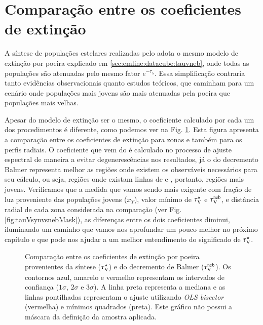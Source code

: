 \section{Comparação entre os coeficientes de extinção}
\label{sec:synvsneb:tauv}

A síntese de populações estelares realizadas pelo \starlight adota o mesmo modelo de extinção por
poeira explicado em \ref{sec:emline:datacube:tauvneb}, onde todas as populações são atenuadas pelo
mesmo fator $e^{-\tau_\lambda}$. Essa simplificação contraria tanto evidências observacionais quanto
estudos teóricos, que caminham para um cenário onde populações mais jovens são mais atenuadas pela
poeira que populações mais velhas. 

Apesar do modelo de extinção ser o mesmo, o coeficiente calculado por cada um dos procedimentos é
diferente, como podemos ver na Fig. \ref{fig:tauVsynvsneb}. Esta figura apresenta a comparação entre
os coeficientes de extinção para zonas e também para os perfis radiais. O coeficiente que vem do
\starlight é calculado no processo de ajuste espectral de maneira a evitar degenerescências nos
resultados, já o do decremento Balmer representa melhor as regiões onde existem os observáveis
necessários para seu cálculo, ou seja, regiões onde existam linhas de \Halpha e \Hbeta, portanto,
regiões mais jovens. Verificamos que a medida que vamos sendo mais exigente com fração de luz
proveniente das populações jovens ($x_Y$), valor mínimo de $\tau_{\mathrm{V}}^\star$ e $\tau_{\mathrm{V}}^{\mathrm{neb}}$, e distância radial
de cada zona considerada na comparação (ver Fig. \ref{fig:tauVsynvsnebMask}), as diferenças entre os
dois coeficientes diminui, iluminando um caminho que vamos nos aprofundar um pouco melhor no próximo
capítulo e que pode nos ajudar a um melhor entendimento do significado de $\tau_{\mathrm{V}}^\star$.

\begin{figure}
	\centering
	\caption[Comparação entre os coeficientes de extinção.] 
	{Comparação entre os coeficientes de extinção por poeira provenientes da síntese ($\tau_{\mathrm{V}}^\star$) e
do decremento de Balmer ($\tau_{\mathrm{V}}^{\mathrm{neb}}$). Os contornos azul, amarelo e vermelho representam os intervalos
de confiança ($1\sigma$, $2\sigma$ e $3\sigma$). A linha preta representa a mediana e as linhas
pontilhadas representam o ajuste utilizando {\em OLS bisector} (vermelha) e mínimos quadrados
(preta). Este gráfico não possui a máscara da definição da amostra aplicada. }
	\label{fig:tauVsynvsneb}
\end{figure}

